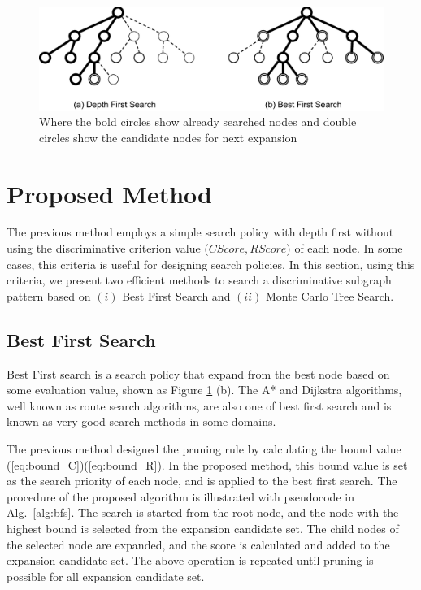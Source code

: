 \begin{figure}[t]
  	\centering
  	\includegraphics[width=0.9\linewidth]{img/search.eps}
	\caption{
		Where the bold circles show already searched nodes and 
		double circles show the candidate nodes for next expansion}
  	\label{fig:search}
\end{figure}

\section{Proposed Method}
The previous method employs a simple search policy with depth first
without using the discriminative criterion value ($CScore, RScore$) of each node.
In some cases, this criteria is useful for designing search policies.
In this section, using this criteria, 
we present two efficient methods to search a discriminative subgraph pattern 
based on $(i)$ Best First Search and $(ii)$ Monte Carlo Tree Search.

\subsection{Best First Search}
Best First search \cite{pearl:1984} is a search policy 
that expand from the best node based on some evaluation value, shown as Figure \ref{fig:search} (b).
The A* and Dijkstra algorithms, well known as route search algorithms, 
are also one of best first search and is known as very good search methods in some domains.

The previous method designed the pruning rule 
by calculating the bound value (\ref{eq:bound_C})(\ref{eq:bound_R}). 
In the proposed method, this bound value is set as the search priority of each node, 
and is applied to the best first search.
The procedure of the proposed algorithm is illustrated with pseudocode in 
Alg.~\ref{alg:bfs}.
The search is started from the root node, 
and the node with the highest bound is selected from the expansion candidate set.
The child nodes of the selected node are expanded, 
and the score is calculated and added to the expansion candidate set.
The above operation is repeated until pruning is possible for all expansion candidate set.\\

